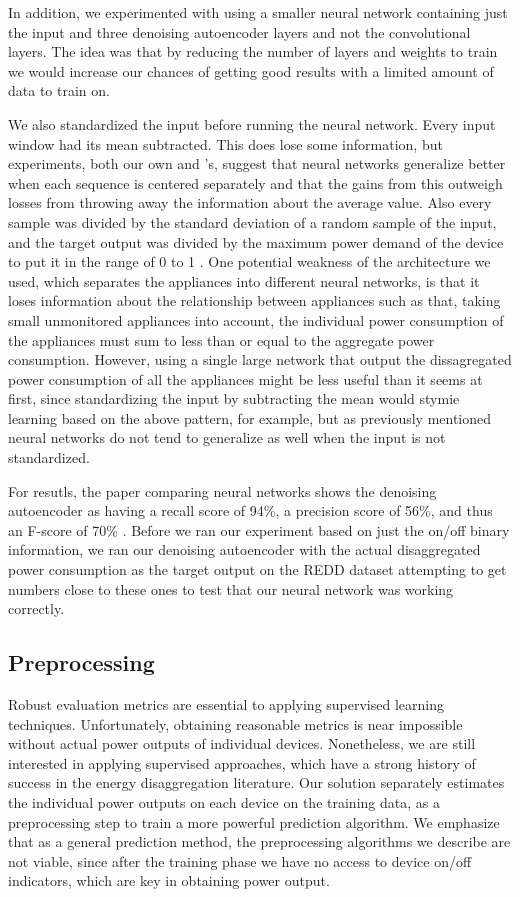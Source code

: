 \documentclass{article}
\begin{document}
In addition, we experimented with using a smaller neural network containing just the input and three denoising autoencoder layers and not the convolutional layers. The idea was that by reducing the number of layers and weights to train we would increase our chances of getting good results with a limited amount of data to train on.

We also standardized the input before running the neural network. Every input window had its mean subtracted. This does lose some information, but experiments, both our own and \cite{Kelly}'s, suggest that neural networks generalize better when each sequence is centered separately and that the gains from this outweigh losses from throwing away the information about the average value. Also every sample was divided by the standard deviation of a random sample of the input, and the target output was divided by the maximum power demand of the device to put it in the range of 0 to 1 \cite{Kelly}. One potential weakness of the architecture we used, which separates the appliances into different neural networks, is that it loses information about the relationship between appliances such as that, taking small unmonitored appliances into account, the individual power consumption of the appliances must sum to less than or equal to the aggregate power consumption. However, using a single large network that output the dissagregated power consumption of all the appliances might be less useful than it seems at first, since standardizing the input by subtracting the mean would stymie learning based on the above pattern, for example, but as previously mentioned neural networks do not tend to generalize as well when the input is not standardized.

For resutls, the paper comparing neural networks shows the denoising autoencoder as having a recall score of 94\%, a precision score of 56\%, and thus an F-score of 70\% \cite{Kelly}. Before we ran our experiment based on just the on/off binary information, we ran our denoising autoencoder with the actual disaggregated power consumption as the target output on the REDD dataset attempting to get numbers close to these ones to test that our neural network was working correctly.

\subsection{Preprocessing}
Robust evaluation metrics are essential to applying supervised learning techniques. Unfortunately, obtaining reasonable metrics is near impossible without actual power outputs of individual devices. Nonetheless, we are still interested in applying supervised approaches, which have a strong history of success in the energy disaggregation literature. Our solution separately estimates the individual power outputs on each device on the training data, as a preprocessing step to train a more powerful prediction algorithm. We emphasize that as a general prediction method, the preprocessing algorithms we describe are not viable, since after the training phase we have no access to device on/off indicators, which are key in obtaining power output.
\end{document}
